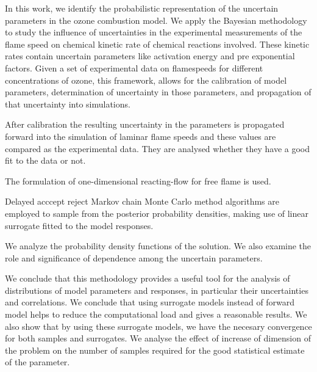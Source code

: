 

In this work, we identify the probabilistic representation of the uncertain parameters in the ozone combustion model. We  apply the Bayesian methodology to study the influence of
uncertainties in the experimental measurements of the flame speed on chemical kinetic rate of chemical reactions involved. These kinetic rates contain uncertain parameters like activation energy and pre exponential factors. Given a set of experimental data on flamespeeds for different concentrations of ozone, this framework, allows for the
calibration of model parameters, determination of uncertainty in those parameters, and propagation
of that uncertainty into simulations.

After calibration the resulting uncertainty in the parameters is propagated forward into
the simulation of laminar flame speeds and these values are compared as the experimental data. They are analysed whether they have a good fit to the data or not. 


The formulation of one-dimensional
reacting-flow for free flame is used.



Delayed acccept reject Markov chain Monte Carlo method 
algorithms are employed to sample from the posterior probability densities, making use of
linear surrogate fitted to the model responses.

We analyze the  probability density functions of the solution. We
also examine the role and significance of dependence among the uncertain parameters. 





We conclude that this methodology provides a useful tool for the analysis of distributions of model parameters and
responses, in particular their uncertainties and correlations. We conclude that using surrogate models instead of forward model helps to reduce the computational load and gives a reasonable results. We also show that by using these surrogate models, we have the necesary convergence for both samples and surrogates. We analyse the effect of increase of dimension of the problem on the number of samples required for the good statistical estimate of the parameter. 
